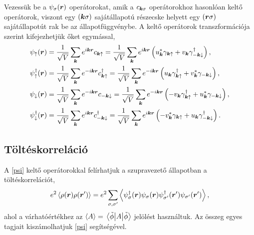 \documentclass[a4paper,12pt,titlepage]{article}
\newcommand{\KK}{{\vb*{k}}}
\newcommand{\RR}{{\vb*{r}}}
\begin{document}
Vezessük be a $\psi_\sigma(\RR)$ operátorokat, amik a $c_{\KK \sigma}$ operátorokhoz hasonlóan keltő operátorok, viszont egy $\left( \KK \sigma \right)$ sajátállapotú részecske helyett egy $\left( \RR \sigma \right)$ sajátállapotút rak be az állapotfüggvénybe.  A keltő operátorok transzformációja szerint kifejezhetjük őket egymással,
\begin{equation} \label{psi}
\begin{split}
	\psi_\uparrow(\RR) & = \frac{1}{\sqrt{V}} \sum\limits_\KK e^{i \KK \RR} c_{\KK \uparrow} = \frac{1}{\sqrt{V}} \sum\limits_\KK e^{i \KK \RR} \left( u_\KK^* \gamma_{\KK \uparrow} + v_\KK \gamma_{-\KK \downarrow}^\dagger \right), \\
	\psi_\uparrow^\dagger(\RR) & = \frac{1}{\sqrt{V}} \sum\limits_\KK e^{-i \KK \RR} c_{\KK \uparrow}^\dagger = \frac{1}{\sqrt{V}} \sum\limits_\KK e^{-i \KK \RR} \left( u_\KK \gamma_{\KK \uparrow}^\dagger + v_\KK^* \gamma_{-\KK \downarrow} \right), \\
	\psi_\downarrow(\RR) & = \frac{1}{\sqrt{V}} \sum\limits_\KK e^{-i \KK \RR} c_{-\KK \downarrow} = \frac{1}{\sqrt{V}} \sum\limits_\KK e^{-i \KK \RR} \left( -v_\KK \gamma_{\KK \uparrow}^\dagger + u_\KK^* \gamma_{-\KK \downarrow} \right), \\
	\psi_\downarrow^\dagger(\RR) & = \frac{1}{\sqrt{V}} \sum\limits_\KK e^{i \KK \RR} c_{-\KK \downarrow}^\dagger = \frac{1}{\sqrt{V}} \sum\limits_\KK e^{i \KK \RR} \left( -v_\KK^* \gamma_{\KK \uparrow} + u_\KK \gamma_{-\KK \downarrow}^\dagger \right).
\end{split}
\end{equation}


\subsection{Töltéskorreláció}

A \eqref{psi} keltő operátorokkal felírhatjuk a szupravezető állapotban a töltéskorrelációt,
\begin{equation}
	e^2 \left< \rho(\RR) \rho(\RR^\prime) \right> = e^2 \sum\limits_{\sigma, \sigma^\prime} \left< \psi_\sigma^\dagger(\RR) \psi_\sigma(\RR) \psi_{\sigma^\prime}^\dagger(\RR^\prime) \psi_{\sigma^\prime}(\RR^\prime) \right>,
\end{equation}
ahol a várhatóértékhez az $\left< A \right> = \matrixelement{\tilde{\phi}}{A}{\tilde{\phi}}$ jelölést használtuk.  Az összeg egyes tagjait kiszámolhatjuk \eqref{psi} segítségével.
\end{document}
